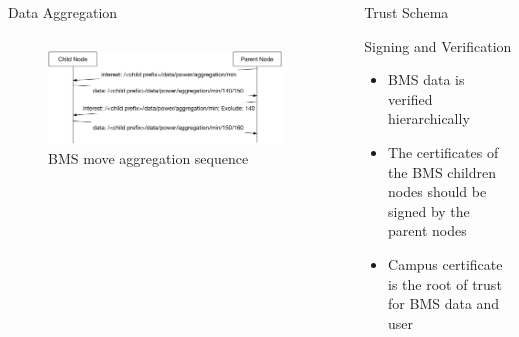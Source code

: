 \documentclass[final,hyperref={pdfpagelabels=false},16pt]{beamer}
\begin{document}
\begin{frame}[t]
\begin{columns}[t]
\begin{column}{.465\textwidth}
\begin{block}{Data Aggregation}
\begin{columns}[T]
\begin{column}{.56\textwidth}
\begin{figure}
\includegraphics[width=\linewidth]{bms-move-aggregate-sequence}
\caption{BMS move aggregation sequence}
\label{fig:move-aggregation}
\end{figure}
\end{column}

\end{columns}

\end{block}

\end{column} %

\begin{column}{.02\textwidth}\end{column} %
 
\begin{column}{.465\textwidth} %


\begin{block}{Trust Schema}

Signing and Verification

\begin{itemize}
\item{BMS data is verified hierarchically}
\item{The certificates of the BMS children nodes should be signed by the parent nodes}
\item{Campus certificate is the root of trust for BMS data and user}
\end{itemize}


\end{block}
\end{column}
\end{columns}
\end{frame}
\end{document}
